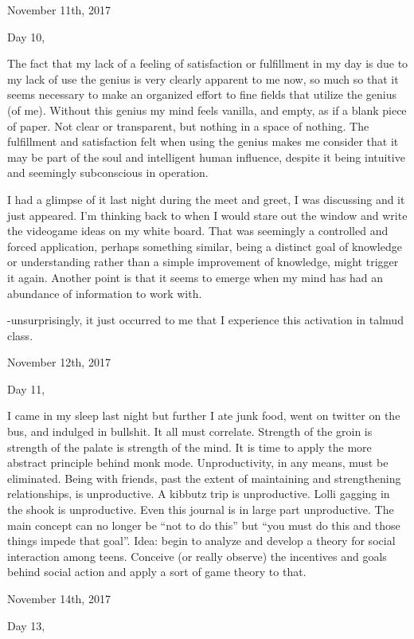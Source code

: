 \bigskip
\bigskip
November 11th, 2017

Day 10,

The fact that my lack of a feeling of satisfaction or fulfillment in my
day is due to my lack of use the genius is very clearly apparent to me
now, so much so that it seems necessary to make an organized effort to
fine fields that utilize the genius (of me). Without this genius my mind
feels vanilla, and empty, as if a blank piece of paper. Not clear or
transparent, but nothing in a space of nothing. The fulfillment and
satisfaction felt when using the genius makes me consider that it may be
part of the soul and intelligent human influence, despite it being
intuitive and seemingly subconscious in operation.

I had a glimpse of it last night during the meet and greet, I was
discussing and it just appeared. I'm thinking back to when I would stare
out the window and write the videogame ideas on my white board. That was
seemingly a controlled and forced application, perhaps something
similar, being a distinct goal of knowledge or understanding rather than
a simple improvement of knowledge, might trigger it again. Another point
is that it seems to emerge when my mind has had an abundance of
information to work with.

-unsurprisingly, it just occurred to me that I experience this
activation in talmud class.

\bigskip
\bigskip
November 12th, 2017

Day 11,

I came in my sleep last night but further I ate junk food, went on
twitter on the bus, and indulged in bullshit. It all must correlate.
Strength of the groin is strength of the palate is strength of the mind.
It is time to apply the more abstract principle behind monk mode.
Unproductivity, in any means, must be eliminated. Being with friends,
past the extent of maintaining and strengthening relationships, is
unproductive. A kibbutz trip is unproductive. Lolli gagging in the shook
is unproductive. Even this journal is in large part unproductive. The
main concept can no longer be ``not to do this'' but ``you must do this
and those things impede that goal''. Idea: begin to analyze and develop
a theory for social interaction among teens. Conceive (or really
observe) the incentives and goals behind social action and apply a sort
of game theory to that.

\bigskip
\bigskip
November 14th, 2017

Day 13,

